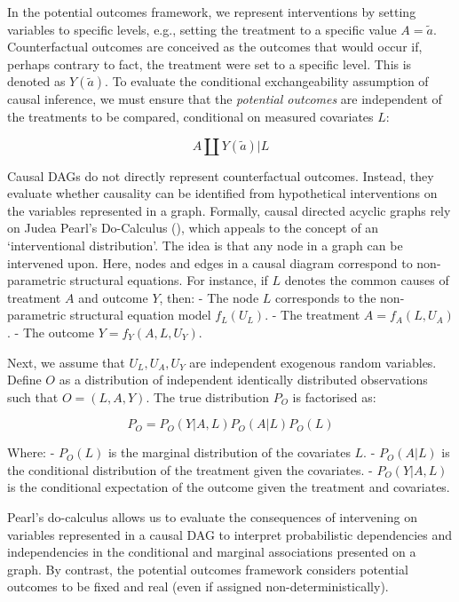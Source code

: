 \documentclass[
  single column]{article}
\begin{document}
In the potential outcomes framework, we represent interventions by
setting variables to specific levels, e.g., setting the treatment to a
specific value \(A = \tilde{a}\). Counterfactual outcomes are conceived
as the outcomes that would occur if, perhaps contrary to fact, the
treatment were set to a specific level. This is denoted as
\(Y(\tilde{a})\). To evaluate the conditional exchangeability assumption
of causal inference, we must ensure that the \emph{potential outcomes}
are independent of the treatments to be compared, conditional on
measured covariates \(L\):

\[
A \coprod Y(\tilde{a})|L
\]

Causal DAGs do not directly represent counterfactual outcomes. Instead,
they evaluate whether causality can be identified from hypothetical
interventions on the variables represented in a graph. Formally, causal
directed acyclic graphs rely on Judea Pearl's Do-Calculus
(), which appeals to the concept of
an `interventional distribution'. The idea is that any node in a graph
can be intervened upon. Here, nodes and edges in a causal diagram
correspond to non-parametric structural equations. For instance, if
\(L\) denotes the common causes of treatment \(A\) and outcome \(Y\),
then: - The node \(L\) corresponds to the non-parametric structural
equation model \(f_L(U_L)\). - The treatment \(A = f_A(L, U_A)\). - The
outcome \(Y = f_Y(A, L, U_Y)\).

Next, we assume that \(U_L, U_A, U_Y\) are independent exogenous random
variables. Define \(O\) as a distribution of independent identically
distributed observations such that \(O = (L, A, Y)\). The true
distribution \(P_O\) is factorised as:

\[
P_O = P_O(Y|A, L) P_O(A|L) P_O(L)
\]

Where: - \(P_O(L)\) is the marginal distribution of the covariates
\(L\). - \(P_O(A|L)\) is the conditional distribution of the treatment
given the covariates. - \(P_O(Y|A, L)\) is the conditional expectation
of the outcome given the treatment and covariates.

Pearl's do-calculus allows us to evaluate the consequences of
intervening on variables represented in a causal DAG to interpret
probabilistic dependencies and independencies in the conditional and
marginal associations presented on a graph. By contrast, the potential
outcomes framework considers potential outcomes to be fixed and real
(even if assigned non-deterministically).
\end{document}

